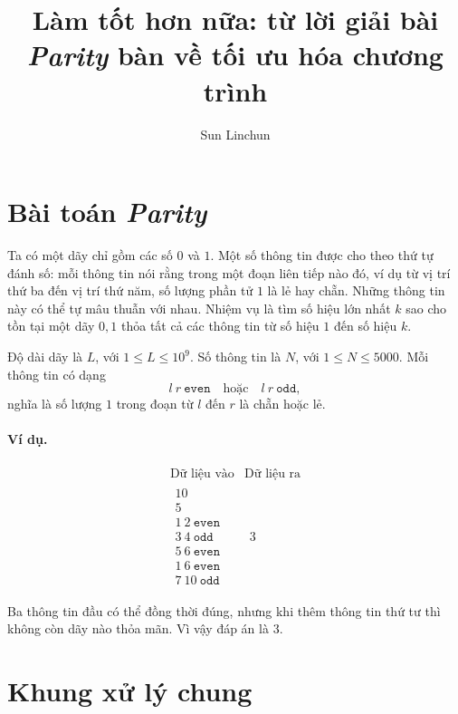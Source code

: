 \documentclass[11pt]{article}
\title{Làm tốt hơn nữa: từ lời giải bài \textit{Parity} bàn về tối ưu hóa chương trình}
\author{Sun Linchun}
\date{}
\begin{document}
\maketitle


\section{Bài toán \textit{Parity}}

Ta có một dãy chỉ gồm các số \(0\) và \(1\). Một số thông tin được cho theo
thứ tự đánh số: mỗi thông tin nói rằng trong một đoạn liên tiếp nào đó, ví dụ
từ vị trí thứ ba đến vị trí thứ năm, số lượng phần tử \(1\) là lẻ hay chẵn.
Những thông tin này có thể tự mâu thuẫn với nhau. Nhiệm vụ là tìm số hiệu lớn
nhất \(k\) sao cho tồn tại một dãy \(0,1\) thỏa tất cả các thông tin từ số
hiệu \(1\) đến số hiệu \(k\).

Độ dài dãy là \(L\), với \(1\le L\le 10^9\). Số thông tin là \(N\), với
\(1\le N\le 5000\). Mỗi thông tin có dạng
\[
  l\ r\ \texttt{even}
  \quad\text{hoặc}\quad
  l\ r\ \texttt{odd},
\]
nghĩa là số lượng \(1\) trong đoạn từ \(l\) đến \(r\) là chẵn hoặc lẻ.

\paragraph{Ví dụ.}
\[
\begin{array}{ll}
\text{Dữ liệu vào} & \text{Dữ liệu ra}\\[0.3em]
\begin{array}{l}
10\\
5\\
1\ 2\ \texttt{even}\\
3\ 4\ \texttt{odd}\\
5\ 6\ \texttt{even}\\
1\ 6\ \texttt{even}\\
7\ 10\ \texttt{odd}
\end{array}
&
\begin{array}{l}
3
\end{array}
\end{array}
\]

Ba thông tin đầu có thể đồng thời đúng, nhưng khi thêm thông tin thứ tư thì
không còn dãy nào thỏa mãn. Vì vậy đáp án là \(3\).

\section{Khung xử lý chung}
\end{document}
